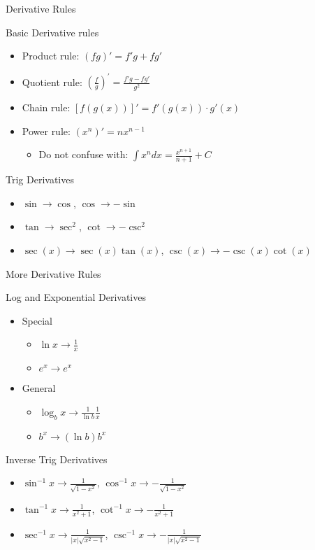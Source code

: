 \documentclass{beamer}
\begin{document}
\begin{frame}[label={sec:org5f23ff0}]{Derivative Rules}
\begin{block}{Basic Derivative rules}
\begin{itemize}
\item Product rule: \((fg)' = f'g + fg'\)
\item Quotient rule: \((\frac{f}{g})^{'} = \frac{f'g - fg'}{g^2}\)
\item Chain rule: \([f(g(x))]' = f'(g(x)) \cdot g'(x)\)
\item Power rule: $(x^n)' = n x^{n-1}$
  \begin{itemize}
  \item \alert{Do not confuse with: $\int x^n dx = \frac{x^{n+1}}{n+1} + C$}
  \end{itemize}
\end{itemize}
\end{block}
\begin{block}{Trig Derivatives}
\begin{itemize}
\item \(\sin \to \cos\), \(\cos \to -\sin\)
\item \(\tan \to \sec^2\), \(\cot \to -\csc^2\)
\item \(\sec(x) \to \sec(x) \tan(x)\), \(\csc(x) \to -\csc(x) \cot(x)\)
\end{itemize}
\end{block}
\end{frame}

\begin{frame}[label={sec:orga8d0a69}]{More Derivative Rules}
\begin{block}{Log and Exponential Derivatives}
\begin{itemize}
\item Special
\begin{itemize}
\item \(\ln x \to \frac 1x\)
\item \(e^x \to e^x\)
\end{itemize}
\item General
\begin{itemize}
\item \(\log_b x \to \frac{1}{\ln b} \frac{1}{x}\)
\item \(b^x \to (\ln b) b^x\)
\end{itemize}
\end{itemize}
\end{block}


\begin{block}{Inverse Trig Derivatives}
\begin{itemize}
\item \(\sin^{-1}x \to \frac{1}{\sqrt{1-x^2}}\), \(\cos^{-1} x \to -\frac{1}{\sqrt{1-x^2}}\)
\item \(\tan^{-1}x \to \frac{1}{x^2 + 1}\), \(\cot^{-1}x \to -\frac{1}{x^2+1}\)
\item \(\sec^{-1}x \to \frac{1}{|x| \sqrt{x^2-1}}\), \(\csc^{-1}x \to -\frac{1}{|x|\sqrt{x^2-1}}\)
\end{itemize}
\end{block}
\end{frame}
\end{document}
